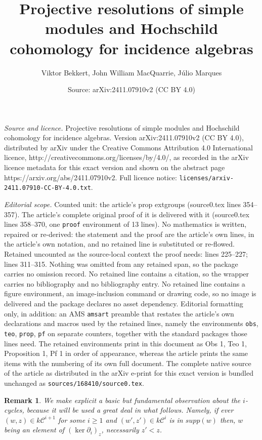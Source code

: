 \documentclass[10pt,a4paper]{amsart}
\title{Projective resolutions of simple modules and Hochschild cohomology for incidence algebras}
\author{Viktor Bekkert, John William MacQuarrie, J\'ulio Marques}
\date{Source: arXiv:2411.07910v2 (CC BY 4.0)}
\newtheorem{obs}{Remark}
\begin{document}
\maketitle

\noindent\emph{Source and licence.} Projective resolutions of simple modules and Hochschild cohomology for incidence algebras. Version arXiv:2411.07910v2 (CC BY 4.0), distributed by arXiv under the Creative Commons Attribution 4.0 International licence, http://creativecommons.org/licenses/by/4.0/, as recorded in the arXiv licence metadata for this exact version and shown on the abstract page https://arxiv.org/abs/2411.07910v2. Full licence notice: \texttt{licenses/arxiv-2411.07910-CC-BY-4.0.txt}.\par\smallskip

\noindent\textit{Editorial scope.} Counted unit: the article's prop extgroups (source0.tex lines 354--357). The article's complete original proof of it is delivered with it (source0.tex lines 358--370, one \texttt{proof} environment of 13 lines). No mathematics is written, repaired or re-derived: the statement and the proof are the article's own lines, in the article's own notation, and no retained line is substituted or re-flowed.  Retained uncounted as the source-local context the proof needs: lines 225--227; lines 311--315.  Nothing was omitted from any retained span, so the package carries no omission record.  No retained line contains a citation, so the wrapper carries no bibliography and no bibliography entry.  No retained line contains a figure environment, an image-inclusion command or drawing code, so no image is delivered and the package declares no asset dependency.  Editorial formatting only, in addition: an AMS \texttt{amsart} preamble that restates the article's own declarations and macros used by the retained lines, namely the environments \texttt{obs}, \texttt{teo}, \texttt{prop}, \texttt{pf} on separate counters, together with the standard packages those lines need.  The retained environments print in this document as Obs 1, Teo 1, Proposition 1, Pf 1 in order of appearance, whereas the article prints the same items with the numbering of its own full document.  The complete native source of the article as distributed in the arXiv e-print for this exact version is bundled unchanged as \texttt{sources/168410/source0.tex}.
\begin{obs}\label{obs z' are less than z}
We make explicit a basic but fundamental observation about the $i$-cycles, because it will be used a great deal in what follows.  Namely, if ever $(w,z)\in k\mathcal{C}^{i+1}$ for some $i\geqslant 1$  and $(w',z')\in k\mathcal{C}^i$ is in $supp(w)$ then, $w$ being an element of $(\ker\partial_{i})_z$, necessarily $z'<z$.
\end{obs}
\end{document}
